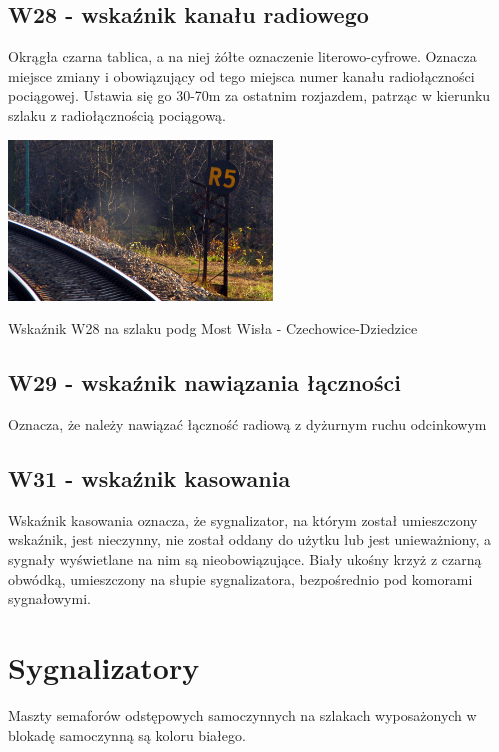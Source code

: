 \subsection{W28 - wskaźnik kanału radiowego}
Okrągła czarna tablica, a na niej żółte oznaczenie literowo-cyfrowe. Oznacza miejsce zmiany i obowiązujący od tego miejsca numer kanału radiołączności pociągowej. Ustawia się go 30-70m za ostatnim rozjazdem, patrząc w kierunku szlaku z radiołącznością pociągową.
	\begin{marginfigure}
		\includegraphics[width=7cm]{skryptkierownik-img/skryptkierownik-img019.jpg}
		\caption{Wskaźnik W28 na szlaku podg Most Wisła - Czechowice-Dziedzice}
		\label{fig:w28}
	\end{marginfigure}

\subsection{W29 - wskaźnik nawiązania łączności}

Oznacza, że należy nawiązać łączność radiową z dyżurnym ruchu odcinkowym

\subsection{W31 - wskaźnik kasowania}

{\textquotedbl}Wskaźnik kasowania{\textquotedbl} oznacza, że sygnalizator, na którym został umieszczony wskaźnik, jest nieczynny, nie został oddany do użytku lub jest unieważniony, a sygnały wyświetlane na nim są nieobowiązujące. Biały ukośny krzyż z czarną obwódką, umieszczony na słupie sygnalizatora, bezpośrednio pod komorami sygnałowymi.

\section{Sygnalizatory}

Maszty semaforów odstępowych samoczynnych na szlakach wyposażonych w blokadę samoczynną są koloru białego.

